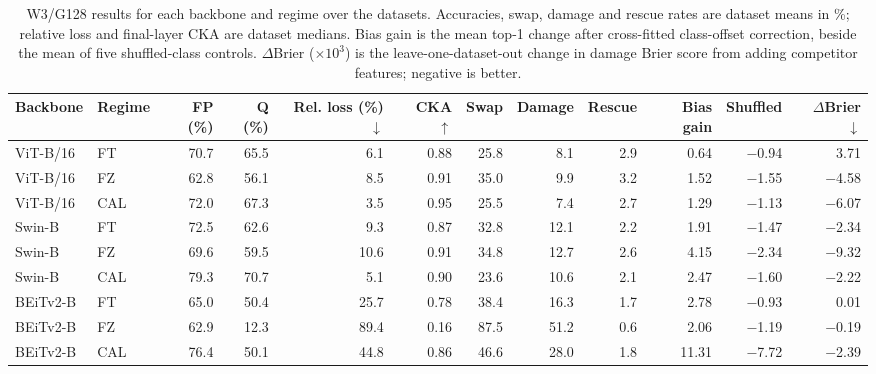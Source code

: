 \begin{table}[t]
\centering
\caption{W3/G128 results for each backbone and regime over the {} datasets. Accuracies, swap, damage and rescue rates are dataset means in \%; relative loss and final-layer CKA are dataset medians. Bias gain is the mean top-1 change after cross-fitted class-offset correction, beside the mean of five shuffled-class controls. $\Delta$Brier ($\times 10^{3}$) is the leave-one-dataset-out change in damage Brier score from adding competitor features; negative is better.}
\label{tab:w3}
\setlength{\tabcolsep}{4pt}
\small
\begin{tabular}{llrrrrrrrrrr}
\toprule
Backbone & Regime & FP (\%) & Q (\%) & Rel. loss (\%) $\downarrow$ & CKA $\uparrow$ & Swap & Damage & Rescue & Bias gain & Shuffled & $\Delta$Brier $\downarrow$ \\
\midrule
ViT-B/16 & FT & 70.7 & 65.5 & 6.1 & 0.88 & 25.8 & 8.1 & 2.9 & 0.64 & $-$0.94 & 3.71 \\
ViT-B/16 & FZ & 62.8 & 56.1 & 8.5 & 0.91 & 35.0 & 9.9 & 3.2 & 1.52 & $-$1.55 & $-$4.58 \\
ViT-B/16 & CAL & 72.0 & 67.3 & 3.5 & 0.95 & 25.5 & 7.4 & 2.7 & 1.29 & $-$1.13 & $-$6.07 \\
Swin-B & FT & 72.5 & 62.6 & 9.3 & 0.87 & 32.8 & 12.1 & 2.2 & 1.91 & $-$1.47 & $-$2.34 \\
Swin-B & FZ & 69.6 & 59.5 & 10.6 & 0.91 & 34.8 & 12.7 & 2.6 & 4.15 & $-$2.34 & $-$9.32 \\
Swin-B & CAL & 79.3 & 70.7 & 5.1 & 0.90 & 23.6 & 10.6 & 2.1 & 2.47 & $-$1.60 & $-$2.22 \\
BEiTv2-B & FT & 65.0 & 50.4 & 25.7 & 0.78 & 38.4 & 16.3 & 1.7 & 2.78 & $-$0.93 & 0.01 \\
BEiTv2-B & FZ & 62.9 & 12.3 & 89.4 & 0.16 & 87.5 & 51.2 & 0.6 & 2.06 & $-$1.19 & $-$0.19 \\
BEiTv2-B & CAL & 76.4 & 50.1 & 44.8 & 0.86 & 46.6 & 28.0 & 1.8 & 11.31 & $-$7.72 & $-$2.39 \\
\bottomrule
\end{tabular}
\end{table}
